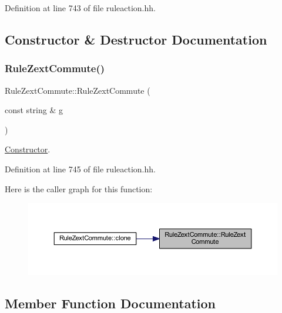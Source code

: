Definition at line 743 of file ruleaction.\+hh.



\subsection{Constructor \& Destructor Documentation}
\mbox{\label{class_rule_zext_commute_a6d4b92a12bec3aa464fe680ea157211f}} 
\subsubsection{\texorpdfstring{RuleZextCommute()}{RuleZextCommute()}}
{\footnotesize\ttfamily Rule\+Zext\+Commute\+::\+Rule\+Zext\+Commute (\begin{DoxyParamCaption}\item[{const string \&}]{g }\end{DoxyParamCaption})\hspace{0.3cm}{\ttfamily [inline]}}



\mbox{\hyperlink{class_constructor}{Constructor}}. 



Definition at line 745 of file ruleaction.\+hh.

Here is the caller graph for this function\+:
\nopagebreak
\begin{figure}[H]
\begin{center}
\leavevmode
\includegraphics[width=350pt]{class_rule_zext_commute_a6d4b92a12bec3aa464fe680ea157211f_icgraph}
\end{center}
\end{figure}


\subsection{Member Function Documentation}
\mbox{\label{class_rule_zext_commute_a04f5c4f8e6cc15d700d777d55c788e81}} 
